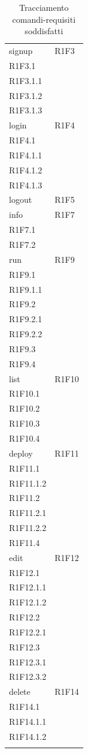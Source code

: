 \begin{itemize}
\begin{longtable}{
							>{\centering}p{}
							>{\centering}p{} }
							signup & R1F3\\ R1F3.1 \\ R1F3.1.1 \\ R1F3.1.2 \\ R1F3.1.3\tabularnewline
							login & R1F4 \\ R1F4.1 \\ R1F4.1.1 \\ R1F4.1.2 \\ R1F4.1.3\tabularnewline
							logout & R1F5\tabularnewline
							info & R1F7 \\ R1F7.1 \\ R1F7.2 \tabularnewline
							run & R1F9 \\ R1F9.1 \\ R1F9.1.1 \\ R1F9.2 \\ R1F9.2.1 \\ R1F9.2.2 \\ R1F9.3 \\ R1F9.4 \tabularnewline
							list & R1F10 \\ R1F10.1 \\ R1F10.2 \\ R1F10.3 \\ R1F10.4 \tabularnewline
							deploy & R1F11 \\ R1F11.1 \\ R1F11.1.2 \\ R1F11.2 \\ R1F11.2.1 \\ R1F11.2.2 \\ R1F11.4\tabularnewline
							edit & R1F12 \\ R1F12.1 \\ R1F12.1.1 \\ R1F12.1.2 \\ R1F12.2 \\ R1F12.2.1 \\ R1F12.3 \\ R1F12.3.1 \\ R1F12.3.2\tabularnewline
							delete & R1F14 \\ R1F14.1 \\ R1F14.1.1 \\ R1F14.1.2\tabularnewline

							\rowcolor{white}\caption{Tracciamento comandi-requisiti soddisfatti}	\\

						\end{longtable}


\end{itemize}
